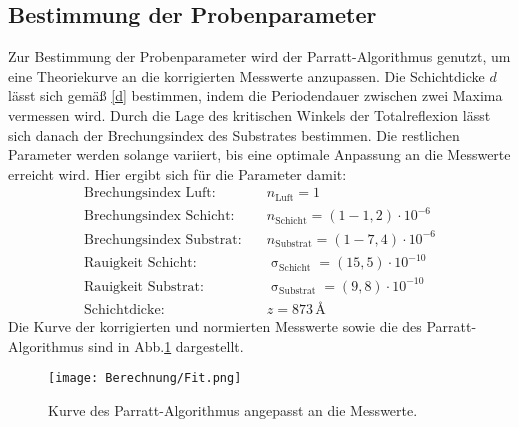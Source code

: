 \subsection{Bestimmung der Probenparameter}
Zur Bestimmung der Probenparameter wird der Parratt-Algorithmus genutzt, um eine Theoriekurve an die  korrigierten Messwerte anzupassen. Die Schichtdicke $d$ lässt sich gemäß \eqref{d} bestimmen, indem die Periodendauer zwischen zwei Maxima vermessen wird. Durch die Lage des kritischen Winkels der Totalreflexion lässt sich danach der Brechungsindex des Substrates bestimmen. Die restlichen Parameter werden solange variiert, bis eine optimale Anpassung an die Messwerte erreicht wird. Hier ergibt sich für die Parameter damit:
\begin{align}
  \text{Brechungsindex Luft}:&\quad n_\text{Luft}=1 \nonumber\\
  \text{Brechungsindex Schicht}:&\quad n_\text{Schicht}= \left(1-1,2\right)\cdot10^{-6} \nonumber\\
  \text{Brechungsindex Substrat}:&\quad n_\text{Substrat}=\left(1-7,4\right)\cdot10^{-6} \nonumber\\
  \text{Rauigkeit Schicht}:&\quad \upsigma_\text{Schicht}=\left(15,5\right)\cdot10^{-10} \nonumber\\
  \text{Rauigkeit Substrat}:&\quad \upsigma_\text{Substrat}=\left(9,8\right)\cdot10^{-10} \nonumber\\
  \text{Schichtdicke}:&\quad z=873\,\si{\angstrom}\nonumber
\end{align}
Die Kurve der korrigierten und normierten Messwerte sowie die des Parratt-Algorithmus sind in Abb.\ref{fit} dargestellt.
\begin{figure}[H]
  \centering
  \texttt{[image: Berechnung/Fit.png]}
  \caption{Kurve des Parratt-Algorithmus angepasst an die Messwerte.}
  \label{fit}
\end{figure}
